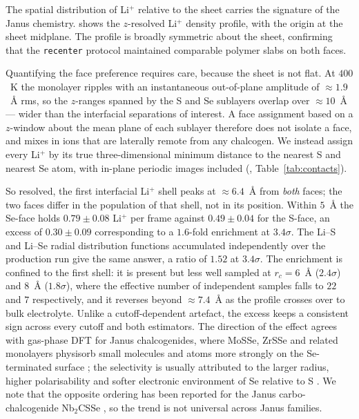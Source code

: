 
The spatial distribution of Li$^+$ relative to the \WSSe sheet carries the signature of the Janus chemistry.  shows the $z$-resolved Li$^+$ density profile, with the origin at the sheet midplane. The profile is broadly symmetric about the sheet, confirming that the \texttt{recenter} protocol maintained comparable polymer slabs on both faces.

Quantifying the face preference requires care, because the sheet is not flat. At $400$~K the monolayer ripples with an instantaneous out-of-plane amplitude of $\approx1.9$~\AA{} rms, so the $z$-ranges spanned by the S and Se sublayers overlap over $\approx10$~\AA{} --- wider than the interfacial separations of interest. A face assignment based on a $z$-window about the mean plane of each sublayer therefore does not isolate a face, and mixes in ions that are laterally remote from any chalcogen. We instead assign every Li$^+$ by its true three-dimensional minimum distance to the nearest S and nearest Se atom, with in-plane periodic images included (, Table~\ref{tab:contacts}).

So resolved, the first interfacial Li$^+$ shell peaks at $\approx6.4$~\AA{} from \emph{both} faces; the two faces differ in the population of that shell, not in its position. Within $5$~\AA{} the Se-face holds $0.79 \pm 0.08$ Li$^+$ per frame against $0.49 \pm 0.04$ for the S-face, an excess of $0.30 \pm 0.09$ corresponding to a $1.6$-fold enrichment at $3.4\sigma$. The Li--S and Li--Se radial distribution functions accumulated independently over the production run give the same answer, a ratio of $1.52$ at $3.4\sigma$. The enrichment is confined to the first shell: it is present but less well sampled at $r_c = 6$~\AA{} ($2.4\sigma$) and $8$~\AA{} ($1.8\sigma$), where the effective number of independent samples falls to $22$ and $7$ respectively, and it reverses beyond $\approx7.4$~\AA{} as the profile crosses over to bulk electrolyte. Unlike a cutoff-dependent artefact, the excess keeps a consistent sign across every cutoff and both estimators. The direction of the effect agrees with gas-phase DFT for Janus chalcogenides, where MoSSe, ZrSSe and related monolayers physisorb small molecules and atoms more strongly on the Se-terminated surface \cite{zhang_langmuir_2024_zrsse, sharma_acsanm_2026_mosse, bounbaa_est_2025_mosy}; the selectivity is usually attributed to the larger radius, higher polarisability and softer electronic environment of Se relative to S \cite{ahmad_apsusc_2023_wsse}. We note that the opposite ordering has been reported for the Janus carbo-chalcogenide Nb$_2$CSSe \cite{rivera_est_2026_nb2csse}, so the trend is not universal across Janus families.

